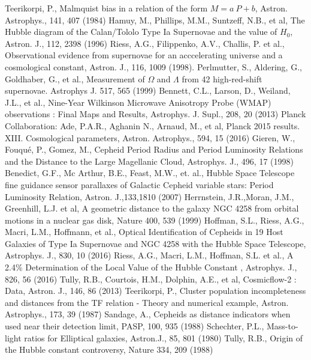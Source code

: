 \begin{thebibliography}{}
Teerikorpi, P., Malmquist bias in a relation of the form $M=a\ P+b$, Astron. Astrophys., 141, 407 (1984)
Hamuy, M., Phillips, M.M., Suntzeff, N.B., et al, The Hubble diagram of the Calan/Tololo Type Ia Supernovae and the value of $H_0$, Astron. J., 112, 2398 (1996)
 Riess, A.G., Filippenko, A.V., Challis, P. et al., Observational evidence from supernovae for an acccelerating universe and a  cosmological constant, Astron. J., 116, 1009 (1998).
 Perlmutter, S., Aldering, G., Goldhaber, G., et al., Measurement of $\Omega$ and $\Lambda$ from 42 high-red-shift supernovae. Astrophys J. 517, 565 (1999)
Bennett, C.L., Larson, D., Weiland, J.L., et al., Nine-Year Wilkinson Microwave Anisotropy Probe (WMAP) observations : Final Maps and Results, Astrophys. J. Supl., 208, 20 (2013)
Planck Collaboration: Ade, P.A.R., Aghanin N., Arnaud, M., et al, Planck 2015 results. XIII. Cosmological parameters, Astron. Astrophys., 594, 15 (2016)
Gieren, W., Fouqu\'{e}, P., Gomez, M., Cepheid Period Radius and Period Luminosity Relations and the Distance to the Large Magellanic Cloud, Astrophys. J., 496, 17 (1998)
Benedict, G.F., Mc Arthur, B.E., Feast, M.W., et. al., Hubble Space Telescope fine guidance sensor parallaxes of Galactic Cepheid variable stars: Period Luminosity Relation, Astron. J.,133,1810 (2007)
Herrnstein, J.R.,Moran, J.M., Greenhill, L.J. et al, A geometric distance to the galaxy NGC 4258 from orbital motions in a nuclear gas disk, Nature 400, 539 (1999)
Hoffman, S.L., Riess, A.G., Macri, L.M., Hoffmann,  et al., Optical Identification of Cepheids in 19 Host Galaxies of Type Ia Supernovae and NGC 4258 with the Hubble Space Telescope, Astrophys. J., 830, 10  (2016)
Riess, A.G., Macri, L.M., Hoffman, S.L.  et al., A 2.4\% Determination of the Local Value of the Hubble Constant , Astrophys. J., 826, 56  (2016)
Tully, R.B., Courtois, H.M., Dolphin, A.E., et al, Cosmicflow-2 : Data, Astron. J., 146, 86 (2013)
Teerikorpi, P., Cluster population incompleteness and distances from the TF relation - Theory and numerical example,  Astron. Astrophys., 173, 39 (1987)
Sandage, A., Cepheids as distance indicators when used near their detection limit, PASP, 100, 935 (1988)
Schechter, P.L., Mass-to-light ratios for Elliptical galaxies, Astron.J., 85, 801 (1980)
Tully, R.B., Origin of the Hubble constant controversy,  Nature 334, 209 (1988)

\end{thebibliography}
